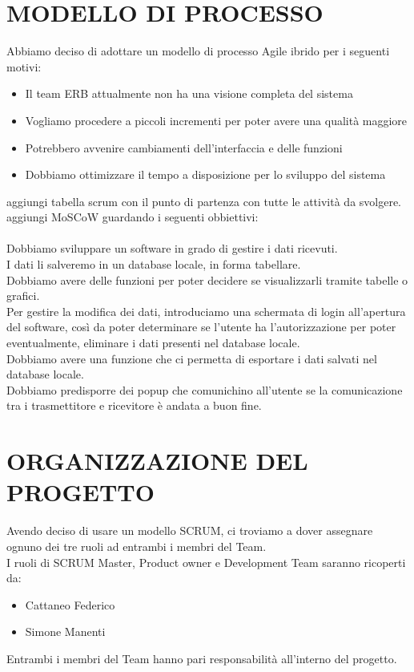 \documentclass{report}
\begin{document}
\chapter{MODELLO DI PROCESSO}
Abbiamo deciso di adottare un modello di processo Agile ibrido per i seguenti motivi:
\begin{itemize}
\item Il team ERB attualmente non ha una visione completa del sistema
\item Vogliamo procedere a piccoli incrementi per poter avere una qualità maggiore 
\item Potrebbero avvenire cambiamenti dell'interfaccia e delle funzioni
\item Dobbiamo ottimizzare il tempo a disposizione per lo sviluppo del sistema
\end{itemize}
aggiungi tabella scrum con il punto di partenza con tutte le attività da svolgere.\\
aggiungi MoSCoW guardando i seguenti obbiettivi:\\\\
Dobbiamo sviluppare un software in grado di gestire i dati ricevuti.\\
I dati li salveremo in un database locale, in forma tabellare.\\
Dobbiamo avere delle funzioni per poter decidere se visualizzarli tramite tabelle o grafici.\\
Per gestire la modifica dei dati, introduciamo una schermata di login all'apertura del software, così da poter determinare se l'utente ha l'autorizzazione per poter eventualmente, eliminare i dati presenti nel database locale.\\
Dobbiamo avere una funzione che ci permetta di esportare i dati salvati nel database locale.\\
Dobbiamo predisporre dei popup che comunichino all'utente se la comunicazione tra i trasmettitore e ricevitore è andata a buon fine.\\ 


\chapter{ORGANIZZAZIONE DEL PROGETTO}
Avendo deciso di usare un modello SCRUM, ci troviamo a dover assegnare ognuno dei tre ruoli ad entrambi i membri del Team.\\
I ruoli di SCRUM Master, Product owner e Development Team saranno ricoperti da:
\begin{itemize}
\item Cattaneo Federico
\item Simone Manenti
\end{itemize}
Entrambi i membri del Team hanno pari responsabilità all'interno del progetto.
\end{document}
